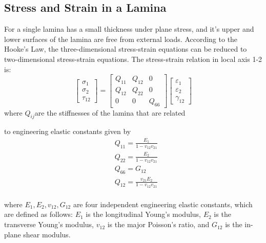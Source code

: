\documentclass{article}
\begin{document}
\subsection{Stress and Strain in a Lamina}
For a single lamina has a small thickness under plane stress, and it's upper and lower surfaces of the lamina are
free from external loads. According to the Hooke's Law, the three-dimensional stress-strain equations can be reduced to
two-dimensional stress-strain equations. The stress-strain relation in local axis 1-2 is:
\begin{equation}
    \begin{bmatrix}
        \sigma _1\\
        \sigma _2\\
        \tau_{12}
    \end{bmatrix}
    =
    \begin{bmatrix}
        Q_{11} & Q_{12} & 0\\
        Q_{12} & Q_{22} & 0\\
        0      &  0     & Q_{66}
    \end{bmatrix}
    \begin{bmatrix}
        \varepsilon_1\\
        \varepsilon_2\\\gamma_{12}
    \end{bmatrix}
\end{equation}
where $Q_{ij} $are the stiffnesses of the lamina that are related

to engineering elastic constants given by
\begin{equation}
    \begin{split}
    &Q_{11}=\frac{E_1}{1-v_{12}v_{21}}\\
    &Q_{22}=\frac{E_2}{1-v_{12}v_{21}}\\
    &Q_{66}=G_{12}\\
    &Q_{12}=\frac{v_{21}E_2}{1-v_{12}v_{21}}\\
    \end{split}
\end{equation}

where $E_1, E_2, v_{12}, G_{12} $ are four independent engineering elastic constants, which are defined as follows: $E_1 $ is the longitudinal Young's modulus, $E_2 $ is the transverse Young's modulus, $v_{12} $ is the major Poisson's ratio, and $G_{12} $ is the in-plane shear modulus.
\end{document}
